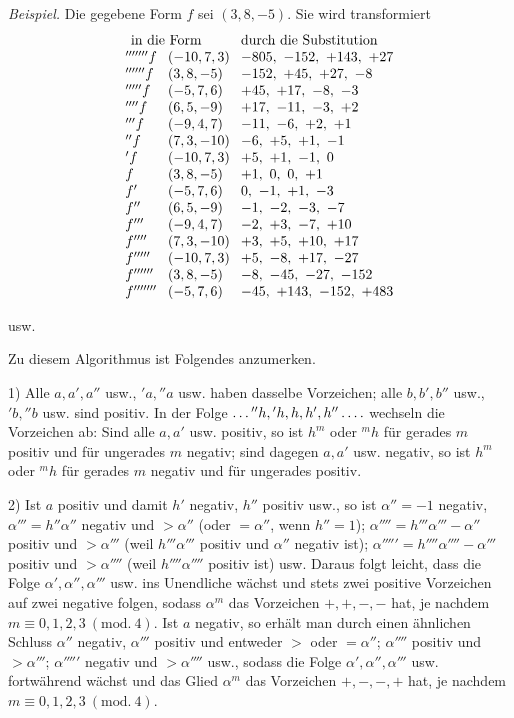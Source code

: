 \textit{Beispiel.} Die gegebene Form $f$ sei $(3,8,-5)$. Sie wird transformiert
\[
\setlength{\arraycolsep}{4pt}
\begin{array}{@{}lll@{}}
\multicolumn{2}{l}{\text{in die Form}}&\text{durch die Substitution}\\
{}'''''''f&(-10,7,3)&-805,\ -152,\ +143,\ +27\\
{}''''''f&(3,8,-5)&-152,\ +45,\ +27,\ -8\\
{}'''''f&(-5,7,6)&+45,\ +17,\ -8,\ -3\\
{}''''f&(6,5,-9)&+17,\ -11,\ -3,\ +2\\
{}'''f&(-9,4,7)&-11,\ -6,\ +2,\ +1\\
{}''f&(7,3,-10)&-6,\ +5,\ +1,\ -1\\
{}'f&(-10,7,3)&+5,\ +1,\ -1,\ 0\\
f&(3,8,-5)&+1,\ 0,\ 0,\ +1\\
f'&(-5,7,6)&0,\ -1,\ +1,\ -3\\
f''&(6,5,-9)&-1,\ -2,\ -3,\ -7\\
f'''&(-9,4,7)&-2,\ +3,\ -7,\ +10\\
f''''&(7,3,-10)&+3,\ +5,\ +10,\ +17\\
f'''''&(-10,7,3)&+5,\ -8,\ +17,\ -27\\
f''''''&(3,8,-5)&-8,\ -45,\ -27,\ -152\\
f'''''''&(-5,7,6)&-45,\ +143,\ -152,\ +483
\end{array}
\]
\centerline{usw.}


Zu diesem Algorithmus ist Folgendes anzumerken.

1) Alle $a,a',a''$ usw., ${}'a,{}''a$ usw. haben dasselbe Vorzeichen; alle $b,b',b''$ usw., ${}'b,{}''b$ usw. sind positiv. In der Folge $\mathinner{\ldotp\ldotp\ldotp} {}''h,{}'h,h,h',h''\mathinner{\ldotp\ldotp\ldotp\ldotp}$ wechseln die Vorzeichen ab: Sind alle $a,a'$ usw. positiv, so ist $h^m$ oder ${}^m h$ für gerades $m$ positiv und für ungerades $m$ negativ; sind dagegen $a,a'$ usw. negativ, so ist $h^m$ oder ${}^m h$ für gerades $m$ negativ und für ungerades positiv.

2) Ist $a$ positiv und damit $h'$ negativ, $h''$ positiv usw., so ist $\alpha''=-1$ negativ, $\alpha'''=h''\alpha''$ negativ und $>\alpha''$ (oder $=\alpha''$, wenn $h''=1$); $\alpha''''=h'''\alpha'''-\alpha''$ positiv und $>\alpha'''$ (weil $h'''\alpha'''$ positiv und $\alpha''$ negativ ist); $\alpha'''''=h''''\alpha''''-\alpha'''$ positiv und $>\alpha''''$ (weil $h''''\alpha''''$ positiv ist) usw. Daraus folgt leicht, dass die Folge $\alpha',\alpha'',\alpha'''$ usw. ins Unendliche wächst und stets zwei positive Vorzeichen auf zwei negative folgen, sodass $\alpha^m$ das Vorzeichen $+,+,-,-$ hat, je nachdem $m\equiv0,1,2,3\ (\mathrm{mod.}\ 4)$. Ist $a$ negativ, so erhält man durch einen ähnlichen Schluss $\alpha''$ negativ, $\alpha'''$ positiv und entweder $>$ oder $=\alpha''$; $\alpha''''$ positiv und $>\alpha'''$; $\alpha'''''$ negativ und $>\alpha''''$ usw.,
sodass die Folge $\alpha',\alpha'',\alpha'''$ usw. fortwährend wächst und das Glied $\alpha^m$ das Vorzeichen $+,-,-,+$ hat, je nachdem $m\equiv0,1,2,3\ (\mathrm{mod.}\ 4)$.

